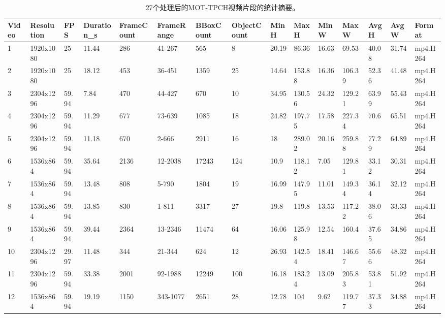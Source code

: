 \begin{landscape}
\begin{table}[H]
    \centering
    \caption{27个处理后的MOT-TPCH视频片段的统计摘要。}
    \label{tab:mot-tpch-stats-zh}
    \scriptsize
    \begin{tabular}{|l|l|l|l|l|l|l|l|l|l|l|l|l|l|l|}
    \hline
        Video & Resolution & FPS & Duration\_s & FrameCount & FrameRange & BBoxCount & ObjectCount & MinH & MaxH & MinW & MaxW & AvgH & AvgW & Format  \\ \hline
        1 & 1920x1080 & 25 & 11.44 & 286 & 41-267 & 565 & 8 & 20.19 & 86.36 & 16.63 & 69.53 & 40.08 & 31.74 & mp4.H264  \\ \hline
        2 & 1920x1080 & 25 & 18.12 & 453 & 36-451 & 1359 & 25 & 14.64 & 153.88 & 16.36 & 106.39 & 52.36 & 41.48 & mp4.H264  \\ \hline
        3 & 2304x1296 & 59.94 & 7.84 & 470 & 44-427 & 670 & 10 & 34.95 & 130.56 & 24.32 & 129.21 & 63.99 & 55.43 & mp4.H264  \\ \hline
        4 & 2304x1296 & 59.94 & 11.29 & 677 & 73-639 & 1085 & 18 & 24.82 & 197.75 & 17.58 & 227.34 & 70.6 & 65.51 & mp4.H264  \\ \hline
        5 & 2304x1296 & 59.94 & 11.18 & 670 & 2-666 & 2911 & 16 & 18 & 289.02 & 20.16 & 259.88 & 77.29 & 64.89 & mp4.H264  \\ \hline
        6 & 1536x864 & 59.94 & 35.64 & 2136 & 12-2038 & 17243 & 124 & 10.9 & 118.12 & 7.05 & 129.81 & 33.12 & 30.31 & mp4.H264  \\ \hline
        7 & 1536x864 & 59.94 & 13.48 & 808 & 5-790 & 1804 & 19 & 16.99 & 147.95 & 11.01 & 149.34 & 36.14 & 32.12 & mp4.H264  \\ \hline
        8 & 1536x864 & 59.94 & 13.85 & 830 & 1-811 & 3317 & 27 & 19.8 & 119.8 & 13.53 & 117.22 & 38.06 & 33.33 & mp4.H264  \\ \hline
        9 & 1536x864 & 59.94 & 39.44 & 2364 & 13-2346 & 11474 & 64 & 16.06 & 125.98 & 12.54 & 160.4 & 37.65 & 34.86 & mp4.H264  \\ \hline
        10 & 2304x1296 & 29.97 & 11.48 & 344 & 21-344 & 624 & 12 & 26.93 & 142.54 & 18.41 & 146.67 & 55.66 & 48.32 & mp4.H264  \\ \hline
        11 & 2304x1296 & 59.94 & 33.38 & 2001 & 92-1988 & 12249 & 100 & 16.18 & 183.24 & 13.09 & 205.83 & 53.81 & 51.92 & mp4.H264  \\ \hline
        12 & 1536x864 & 59.94 & 19.19 & 1150 & 343-1077 & 2651 & 28 & 12.78 & 104 & 9.62 & 119.77 & 37.33 & 34.88 & mp4.H264  \\ \hline

\end{tabular}
\end{table}
\end{landscape}
